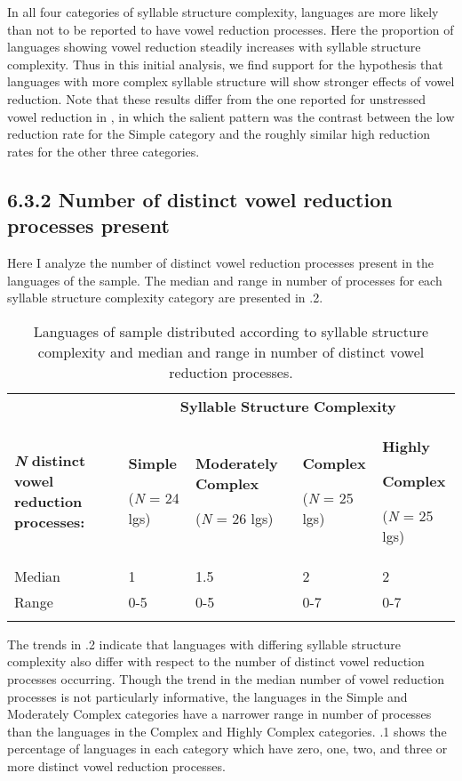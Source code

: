   In all four categories of syllable structure complexity, languages are more likely than not to be reported to have vowel reduction processes. Here the proportion of languages showing vowel reduction steadily increases with syllable structure complexity. Thus in this initial analysis, we find support for the hypothesis that languages with more complex syllable structure will show stronger effects of vowel reduction. Note that these results differ from the one reported for unstressed vowel reduction in , in which the salient pattern was the contrast between the low reduction rate for the Simple category and the roughly similar high reduction rates for the other three categories.

\subsection{6.3.2 Number of distinct vowel reduction processes present}

  Here I analyze the number of distinct vowel reduction processes present in the languages of the sample. The median and range in number of processes for each syllable structure complexity category are presented in .2.

\begin{table}
\begin{tabularx}{\textwidth}{XXXXX}
\lsptoprule
 & \multicolumn{4}{c}{ \textbf{Syllable} \textbf{Structure} \textbf{Complexity}}\\
 \textbf{\textit{N}} \textbf{distinct} \textbf{vowel} \textbf{reduction} \textbf{processes:} & { \textbf{Simple}}

 (\textit{N} = 24 lgs) & { \textbf{Moderately} \textbf{Complex}}

 (\textit{N} = 26 lgs) & { \textbf{Complex}}

 (\textit{N} = 25 lgs) & { \textbf{Highly} }

{ \textbf{Complex}}

 (\textit{N} = 25 lgs)\\
 Median & 1 & 1.5 & 2 & 2\\
 Range & 0-5 & 0-5 & 0-7 & 0-7\\
\lspbottomrule
\end{tabularx}
\caption{\label{6.2}Languages of sample distributed according to syllable structure complexity and median and range in number of distinct vowel reduction processes.}
\end{table}

  The trends in .2 indicate that languages with differing syllable structure complexity also differ with respect to the number of distinct vowel reduction processes occurring. Though the trend in the median number of vowel reduction processes is not particularly informative, the languages in the Simple and Moderately Complex categories have a narrower range in number of processes than the languages in the Complex and Highly Complex categories. .1 shows the percentage of languages in each category which have zero, one, two, and three or more distinct vowel reduction processes.

